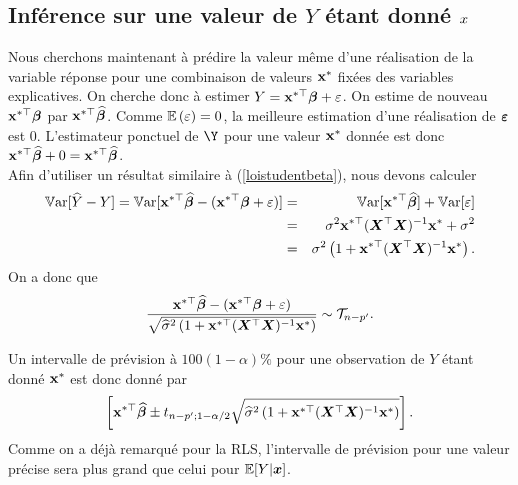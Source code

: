 \subsection{Inférence sur une valeur de $Y$ étant donné $x$}
\label{sec:previsionRLM2}


Nous cherchons maintenant à prédire la valeur même d'une
réalisation de la variable réponse pour une combinaison de
valeurs $\bold{x}^*$ fixées des variables explicatives. 
On cherche donc à estimer $Y=\bold{x}^{*\top}\bm\beta+\varepsilon$. On estime de nouveau
$\bold{x}^{*\top}\bm\beta$ par $\bold{x}^{*\top}\widehat{\bm\beta}$. Comme
$\mathbb{E}\left(\varepsilon\right)={0}$, la meilleure estimation d'une réalisation de
$\bm\varepsilon$ est ${0}$. L'estimateur ponctuel de $\Y$ pour une
valeur $\bold{x}^*$ donnée est donc
$\bold{x}^{*\top}\widehat{\bm\beta}+0=\bold{x}^{*\top}\widehat{\bm\beta}$. \\

Afin d'utiliser
un résultat similaire à (\ref{loistudentbeta}), nous devons calculer
\begin{eqnarray*}
\mathbb{V}\text{ar}[\widehat{Y}-Y]=\mathbb{V}\text{ar}[\bold{x}^{*\top}\widehat{\bm\beta}-(\bold{x}^{*\top}\bm\beta+\varepsilon)]&=&
\mathbb{V}\text{ar}[\bold{x}^{*\top}\widehat{\bm\beta}]+\mathbb{V}\text{ar}[\varepsilon]\\
&=&\sigma^2\bold{x}^{*\top}(\bm{X}^\top\bm{X})^{-1}\bold{x}^*+\sigma^2\\
&=&\sigma^2\left(
1+\bold{x}^{*\top}(\bm{X}^\top\bm{X})^{-1}\bold{x}^*\right).
\end{eqnarray*}
On a donc que
\begin{equation}\label{pivot:Y}
{\bold{x}^{*\top}\widehat{\bm\beta}-(\bold{x}^{*\top}\bm\beta+\varepsilon)\over
\sqrt{\widehat{\sigma}^2\left(1+\bold{x}^{*\top}(\bm{X}^\top\bm{X})^{-1}\bold{x}^*\right)}}\sim
\mathcal{T}_{n-p'}.
\end{equation}

Un intervalle de prévision \`a $100(1-\alpha)\%$ pour une observation de $Y$ étant donné $\bold{x}^*$ est donc donné par
\begin{equation}\label{ci:Y}
\left[\bold{x}^{*\top}\widehat{\bm\beta}\pm
t_{n-p';1-\alpha/2}\sqrt{\widehat{\sigma}^2\left(1+\bold{x}^{*\top}(\bm{X}^\top\bm{X})^{-1}\bold{x}^*\right)}\right].
\end{equation}
Comme on a déjà remarqué pour la RLS, l'intervalle de prévision pour une valeur précise sera plus grand que celui pour $\mathbb{E}[Y|\bm{x}]$.

